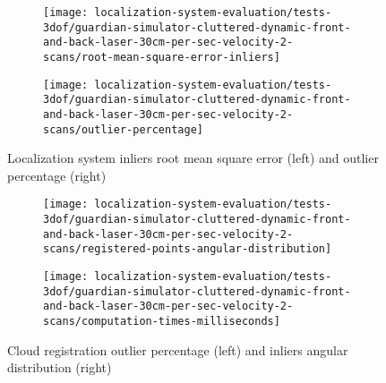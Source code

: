 \begin{figure}[ht]
	\centering
	\begin{subfigure}[h]{0.47\textwidth}
		\centering
		\texttt{[image: localization-system-evaluation/tests-3dof/guardian-simulator-cluttered-dynamic-front-and-back-laser-30cm-per-sec-velocity-2-scans/root-mean-square-error-inliers]}
	\end{subfigure}
	\begin{subfigure}[h]{0.47\textwidth}
		\centering
		\texttt{[image: localization-system-evaluation/tests-3dof/guardian-simulator-cluttered-dynamic-front-and-back-laser-30cm-per-sec-velocity-2-scans/outlier-percentage]}
	\end{subfigure}
	\caption{Localization system inliers root mean square error (left) and outlier percentage (right)}
	\label{fig:localization-system-evaluation_guardian-simulator-cluttered-dynamic-front-and-back-laser-30cm-per-sec-velocity-2-scans_inliers-rmse-outliers-percentage}
\end{figure}

\begin{figure}[hb]
	\centering
	\begin{subfigure}[h]{0.47\textwidth}
		\centering
		\texttt{[image: localization-system-evaluation/tests-3dof/guardian-simulator-cluttered-dynamic-front-and-back-laser-30cm-per-sec-velocity-2-scans/registered-points-angular-distribution]}
	\end{subfigure}
	\begin{subfigure}[h]{0.47\textwidth}
		\centering
		\texttt{[image: localization-system-evaluation/tests-3dof/guardian-simulator-cluttered-dynamic-front-and-back-laser-30cm-per-sec-velocity-2-scans/computation-times-milliseconds]}
	\end{subfigure}
	\caption{Cloud registration outlier percentage (left) and inliers angular distribution (right)}
	\label{fig:localization-system-evaluation_guardian-simulator-cluttered-dynamic-front-and-back-laser-30cm-per-sec-velocity-2-scans_angular-distribution-analysis-computation-time}
\end{figure}
